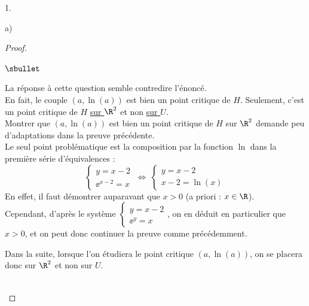 \documentclass[11pt]{article}%
\begin{document}
\begin{noliste}{1.}
\begin{noliste}{a)}
\begin{proof}
      
      
      \newpage
      
      
      \begin{remark}
       \begin{noliste}{$\sbullet$}
        \item La réponse à cette question semble contredire l'énoncé.\\
        En fait, le couple $(a,\ln(a))$ est bien un point critique de 
        $H$. Seulement, c'est un point critique de $H$ \underline{sur 
        $\R^2$} et non \underline{sur $U$}.\\[.1cm]
        Montrer que $(a,\ln(a))$ est bien un point critique de $H$ sur 
        $\R^2$ demande peu d'adaptations dans la preuve précédente.\\
        Le seul point problématique est la 
        composition par la fonction $\ln$ dans la première série 
        d'équivalences :
        \[
          \left\{
          \begin{array}{l}
            y = x-2\\
            \ee^{x-2} = x
          \end{array}
          \right.
          \ \Leftrightarrow \
          \left\{
          \begin{array}{l}
            y = x-2\\[.1cm]
            x-2 = \ln(x)
          \end{array}
          \right.
        \]
        En effet, il faut démontrer auparavant que $x>0$ (a priori :
        $x\in \R$).\\
        Cependant, d'après le système $\left\{
        \begin{array}{l}
          y = x-2\\[.1cm]
          \ee^y = x
        \end{array}
        \right.$, on en déduit en particulier que $x>0$, et on peut donc
        continuer la preuve comme précédemment.
        
        \item Dans la suite, lorsque l'on étudiera le point critique 
        $(a,\ln(a))$, on se placera donc sur $\R^2$ et non sur $U$.
       \end{noliste}
      \end{remark}~\\[-1.4cm]
    \end{proof}
  \end{noliste}
  

\end{noliste}
\end{document}
